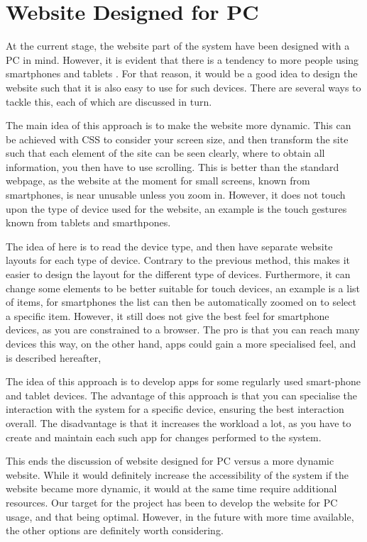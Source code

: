 \section*{Website Designed for PC}
At the current stage, the website part of the system have been designed with a PC in mind.
However, it is evident that there is a tendency to more people using smartphones and tablets \citep{article:smartphonetabletincrease}.
For that reason, it would be a good idea to design the website such that it is also easy to use for such devices.
There are several ways to tackle this, each of which are discussed in turn.
\begin{description}[style=nextline]
	\item[Dynamic scaling]
	The main idea of this approach is to make the website more dynamic. This can be achieved with CSS to consider your screen size, and then transform the site such that each element of the site can be seen clearly, where to obtain all information, you then have to use scrolling.
	This is better than the standard webpage, as the website at the moment for small screens, known from smartphones, is near unusable unless you zoom in.
	However, it does not touch upon the type of device used for the website, an example is the touch gestures known from tablets and smarthpones.
	\item[Detection of device type]
	The idea of here is to read the device type, and then have separate website layouts for each type of device. Contrary to the previous method, this makes it easier to design the layout for the different type of devices.
	Furthermore, it can change some elements to be better suitable for touch devices, an example is a list of items, for smartphones the list can then be automatically zoomed on to select a specific item.
	However, it still does not give the best feel for smartphone devices, as you are constrained to a browser.
	The pro is that you can reach many devices this way, on the other hand, apps could gain a more specialised feel, and is described hereafter,
	\item[Separate Application]
	The idea of this approach is to develop apps for some regularly used smart-phone and tablet devices.
	The advantage of this approach is that you can specialise the interaction with the system for a specific device, ensuring the best interaction overall.
	The disadvantage is that it increases the workload a lot, as you have to create and maintain each such app for changes performed to the system.	
\end{description}
This ends the discussion of website designed for PC versus a more dynamic website.
While it would definitely increase the accessibility of the system if the website became more dynamic, it would at the same time require additional resources.
Our target for the project has been to develop the website for PC usage, and that being optimal.
However, in the future with more time available, the other options are definitely worth considering.

